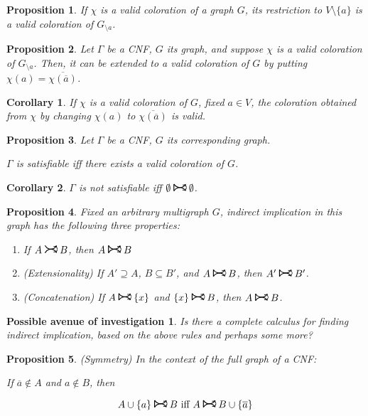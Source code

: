 \documentclass[11pt]{article}
\newcommand{\conj}[1]{\overline{#1}}
\newcommand{\rightcurvearrow}{
\mathrel{
  \begin{tikzpicture}[scale=0.8]
    \draw[thick,->] (0,1ex) arc (30:150:-2ex);
    \draw[thick,->] (0,-1ex) arc (150:30:2ex);
  \end{tikzpicture}
}
}
\newcommand{\Rightcurvearrow}{
\mathrel{
  \begin{tikzpicture}[scale=0.8]
    \draw[thick,->] (0,1ex) arc (30:150:-2ex);
    \draw[thick,->] (0,-1ex) arc (150:30:2ex);
    \draw[thick] (0, 1ex) -- (0, -1ex);
  \end{tikzpicture}
}
}
\newtheorem{prop}{Proposition}
\newtheorem{corollary}{Corollary}
\newtheorem*{av}{Possible avenue of investigation}
\begin{document}
\begin{prop}
If $\chi$ is a valid coloration of a graph $G$, its restriction to $V \setminus \{a\}$ is a valid coloration of $G_{\setminus a}$.
\end{prop}

\begin{prop}
Let $\Gamma$ be a CNF, $G$ its graph, and suppose $\chi$ is a valid coloration of $G_{\setminus a}$. Then, it can be extended to a valid coloration of $G$ by putting $\chi(a) = \conj{\chi(\conj a)}$.
\end{prop}

\begin{corollary} \label{swapvalue}
If $\chi$ is a valid coloration of $G$, fixed $a \in V$, the coloration obtained from $\chi$ by changing $\chi(a)$ to $\conj{\chi(\conj a)}$ is valid.
\end{corollary}

\begin{prop}
Let $\Gamma$ be a CNF, $G$ its corresponding graph.

$\Gamma$ is satisfiable iff there exists a valid coloration of $G$.
\end{prop}

\begin{corollary}
$\Gamma$ is not satisfiable iff $\emptyset \Rightcurvearrow \emptyset$.
\end{corollary}

\begin{prop}
Fixed an arbitrary multigraph $G$, indirect implication in this graph has the following three properties:

\begin{enumerate}[i]
\item If $A \rightcurvearrow B$, then $A \Rightcurvearrow B$
\item (Extensionality) If $A' \supseteq A$, $B \subseteq B'$, and $A \Rightcurvearrow B$, then $A' \Rightcurvearrow B'$.
\item (Concatenation) If $A \Rightcurvearrow \{x\}$ and $\{x\} \Rightcurvearrow B$, then $A \Rightcurvearrow B$.
\end{enumerate}
\end{prop}

\begin{av}
Is there a complete calculus for finding indirect implication, based on the above rules and perhaps some more?
\end{av}

\begin{prop} (Symmetry)
In the context of the full graph of a CNF:

If $\conj a \not \in A$ and $a \not \in B$, then

\[ A \cup \{a\} \Rightcurvearrow B \text{ iff } A \Rightcurvearrow B \cup \{\conj a\} \]
\end{prop}
\end{document}
